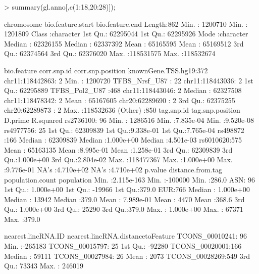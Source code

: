 \documentclass[12pt,fullpage]{article}
\begin{document}
\begin{Schunk}
\begin{Sinput}
> summary(gl.anno[,c(1:18,20:28)]);
\end{Sinput}
\begin{Soutput}
  chromosome        bio.feature.start   bio.feature.end    
 Length:862         Min.   :  1200710   Min.   :  1201809  
 Class :character   1st Qu.: 62295044   1st Qu.: 62295926  
 Mode  :character   Median : 62326155   Median : 62337392  
                    Mean   : 65165595   Mean   : 65169512  
                    3rd Qu.: 62374564   3rd Qu.: 62376020  
                    Max.   :118531575   Max.   :118532674  
                                                           
             bio.feature           corr.snp.id  corr.snp.position  
 knownGene.TSS.hg19:372   chr11:118442863:  2   Min.   :  1200720  
 TFBS_Nrsf_U87     : 22   chr11:118443036:  2   1st Qu.: 62295889  
 TFBS_Pol2_U87     :468   chr11:118443046:  2   Median : 62327508  
                          chr11:118478342:  2   Mean   : 65167605  
                          chr20:62289690 :  2   3rd Qu.: 62375255  
                          chr20:62289873 :  2   Max.   :118532636  
                          (Other)        :850                      
     tag.snp.id  tag.snp.position       D.prime            R.squared        
 rs2736100: 96   Min.   :  1286516   Min.   :7.835e-04   Min.   :9.520e-08  
 rs4977756: 25   1st Qu.: 62309839   1st Qu.:9.338e-01   1st Qu.:7.765e-04  
 rs498872 :166   Median : 62309839   Median :1.000e+00   Median :4.501e-03  
 rs6010620:575   Mean   : 65163135   Mean   :8.995e-01   Mean   :1.258e-01  
                 3rd Qu.: 62309839   3rd Qu.:1.000e+00   3rd Qu.:2.804e-02  
                 Max.   :118477367   Max.   :1.000e+00   Max.   :9.776e-01  
                                     NA's   :4.710e+02   NA's   :4.710e+02  
    p.value           distance.from.tag population.count population
 Min.   :2.115e-163   Min.   :-100000   Min.   :286.0    ASN: 96   
 1st Qu.: 1.000e+00   1st Qu.: -19966   1st Qu.:379.0    EUR:766   
 Median : 1.000e+00   Median :  13942   Median :379.0              
 Mean   : 7.989e-01   Mean   :   4470   Mean   :368.6              
 3rd Qu.: 1.000e+00   3rd Qu.:  25290   3rd Qu.:379.0              
 Max.   : 1.000e+00   Max.   :  67371   Max.   :379.0              
                                                                   
      nearest.lincRNA.ID nearest.lincRNA.distancetoFeature
 TCONS_00010241: 96      Min.   :-265183                  
 TCONS_00015797: 25      1st Qu.: -92280                  
 TCONS_00020001:166      Median :  59111                  
 TCONS_00027984: 26      Mean   :   2073                  
 TCONS_00028269:549      3rd Qu.:  73343                  
                         Max.   : 246019                  
                                                          

\end{Soutput}
\end{Schunk}
\end{document}
